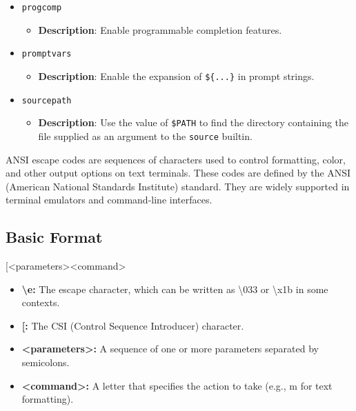 \documentclass{report}
\begin{document}
\begin{itemize}
    \item \texttt{progcomp}
        \begin{itemize}
            \item \textbf{Description}: Enable programmable completion features.
        \end{itemize}

    \item \texttt{promptvars}
        \begin{itemize}
            \item \textbf{Description}: Enable the expansion of \texttt{\$\{...\}} in prompt strings.
        \end{itemize}

    \item \texttt{sourcepath}
        \begin{itemize}
            \item \textbf{Description}: Use the value of \texttt{\$PATH} to find the directory containing the file supplied as an argument to the \texttt{source} builtin.
        \end{itemize}
\end{itemize}    

\pagebreak 
{}
\bigbreak \noindent 
\begin{concept}
    ANSI escape codes are sequences of characters used to control formatting, color, and other output options on text terminals. These codes are defined by the ANSI (American National Standards Institute) standard. They are widely supported in terminal emulators and command-line interfaces.
\end{concept}
\bigbreak \noindent 
\subsection{Basic Format}
\bigbreak \noindent 
\begin{bashcode}
    \e[<parameters><command>
\end{bashcode}

\begin{itemize}
    \item \textbf{\textbackslash e:} The escape character, which can be written as \textbackslash 033 or \textbackslash x1b in some contexts.
    \item \textbf{[:} The CSI (Control Sequence Introducer) character.
    \item \textbf{<parameters>:} A sequence of one or more parameters separated by semicolons.
    \item \textbf{<command>:} A letter that specifies the action to take (e.g., m for text formatting).
\end{itemize}
\end{document}
